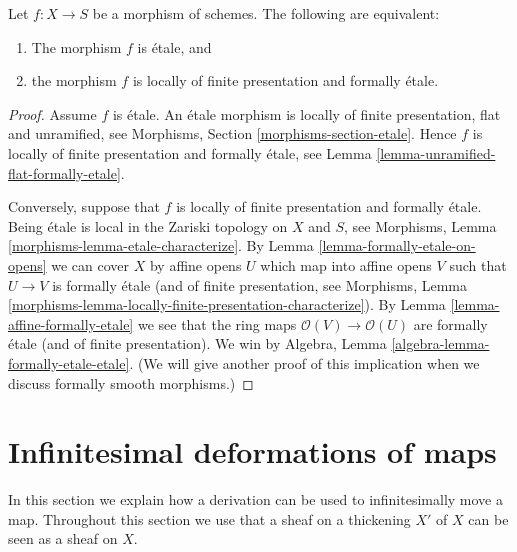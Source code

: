\begin{lemma}
\label{lemma-etale-formally-etale}
Let $f : X \to S$ be a morphism of schemes.
The following are equivalent:
\begin{enumerate}
\item The morphism $f$ is \'etale, and
\item the morphism $f$ is locally of finite presentation and
formally \'etale.
\end{enumerate}
\end{lemma}

\begin{proof}
Assume $f$ is \'etale.
An \'etale morphism is locally of finite presentation, flat and unramified, see
Morphisms, Section \ref{morphisms-section-etale}.
Hence $f$ is locally of finite presentation and formally \'etale, see
Lemma \ref{lemma-unramified-flat-formally-etale}.

\medskip\noindent
Conversely, suppose that $f$ is locally of finite presentation and
formally \'etale. Being \'etale is local in the Zariski topology on
$X$ and $S$, see
Morphisms, Lemma \ref{morphisms-lemma-etale-characterize}.
By
Lemma \ref{lemma-formally-etale-on-opens}
we can cover $X$ by affine opens $U$ which map into affine opens
$V$ such that $U \to V$ is formally \'etale (and of finite presentation, see
Morphisms,
Lemma \ref{morphisms-lemma-locally-finite-presentation-characterize}).
By
Lemma \ref{lemma-affine-formally-etale}
we see that the ring maps $\mathcal{O}(V) \to \mathcal{O}(U)$ are
formally \'etale (and of finite presentation).
We win by
Algebra, Lemma \ref{algebra-lemma-formally-etale-etale}.
(We will give another proof of this implication when we discuss
formally smooth morphisms.)
\end{proof}













\section{Infinitesimal deformations of maps}
\label{section-action-by-derivations}

\noindent
In this section we explain how a derivation can be used to
infinitesimally move a map. Throughout this section we use that
a sheaf on a thickening $X'$ of $X$ can be seen as a sheaf on $X$.

